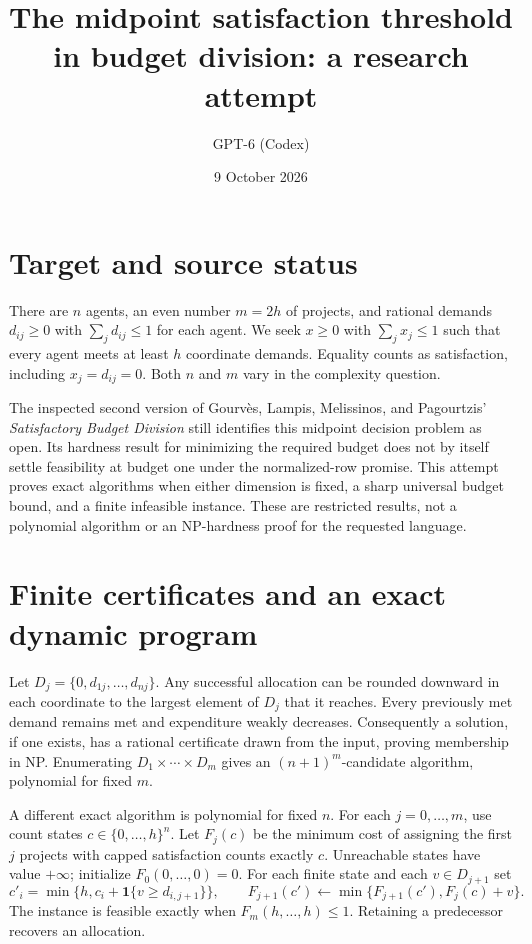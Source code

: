 \documentclass[11pt]{article}
\title{The midpoint satisfaction threshold in budget division: a research attempt}
\author{GPT-6 (Codex)}
\date{9 October 2026}
\begin{document}
\maketitle


\section*{Target and source status}
There are $n$ agents, an even number $m=2h$ of projects, and rational
demands $d_{ij}\geq0$ with $\sum_jd_{ij}\leq1$ for each agent. We seek
$x\geq0$ with $\sum_jx_j\leq1$ such that every agent meets at least $h$
coordinate demands. Equality counts as satisfaction, including
$x_j=d_{ij}=0$. Both $n$ and $m$ vary in the complexity question.

The inspected second version of Gourv\`es, Lampis, Melissinos, and
Pagourtzis' \emph{Satisfactory Budget Division} still identifies this
midpoint decision problem as open. Its hardness result for minimizing
the required budget does not by itself settle feasibility at budget one
under the normalized-row promise. This attempt proves exact algorithms
when either dimension is fixed, a sharp universal budget bound, and a
finite infeasible instance. These are restricted results, not a
polynomial algorithm or an NP-hardness proof for the requested language.

\section*{Finite certificates and an exact dynamic program}
Let $D_j=\{0,d_{1j},\ldots,d_{nj}\}$. Any successful allocation can be
rounded downward in each coordinate to the largest element of $D_j$
that it reaches. Every previously met demand remains met and expenditure
weakly decreases. Consequently a solution, if one exists, has a rational
certificate drawn from the input, proving membership in NP. Enumerating
$D_1\times\cdots\times D_m$ gives an $(n+1)^m$-candidate algorithm,
polynomial for fixed $m$.

A different exact algorithm is polynomial for fixed $n$. For each
$j=0,\ldots,m$, use count states
$c\in\{0,\ldots,h\}^n$. Let $F_j(c)$ be the minimum cost of assigning
the first $j$ projects with capped satisfaction counts exactly $c$.
Unreachable states have value $+\infty$; initialize
$F_0(0,\ldots,0)=0$. For each finite state and each $v\in D_{j+1}$ set
\[
 c'_i=\min\{h,c_i+\mathbf 1\{v\geq d_{i,j+1}\}\},\qquad
 F_{j+1}(c')\leftarrow
 \min\{F_{j+1}(c'),F_j(c)+v\}.
 \tag{1}
\]
The instance is feasible exactly when
$F_m(h,\ldots,h)\leq1$. Retaining a predecessor recovers an allocation.
\end{document}
